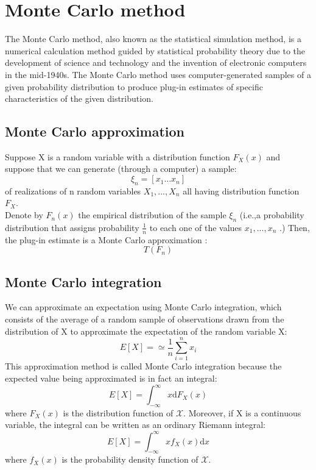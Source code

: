 \section{Monte Carlo method}
 The Monte Carlo method, also known as the statistical simulation method, is a numerical calculation method guided by statistical probability theory due to the development of science and technology and the invention of electronic computers in the mid-1940s. The Monte Carlo method uses computer-generated samples of a given probability distribution to produce plug-in estimates of specific characteristics of the given distribution. \cite{anderson1986scientific,binder1993monte} \\
\subsection{Monte Carlo approximation}
Suppose X is a random variable with a distribution function $F_{X}(x)$ and suppose that we can generate (through a computer) a sample: \cite{MonteCarlo}
\begin{equation} \nonumber 
\xi _{n} = \left [ x_{1} \dots x_{n}  \right ]  
\end{equation}
of realizations of  n random variables  $X_{1}, ..., X_{n}$ all having distribution function  $F_{X}$. \\

Denote by $F_{n}(x)$ the empirical distribution of the sample $\xi _{n} $ (i.e.,a probability distribution that assigns probability $\frac{1}{n}$ to each one of the values $x_{1}, ..., x_{n}$ .)
Then, the plug-in estimate is a Monte Carlo approximation : 
\begin{equation} \nonumber 
T(F_{n} )  
\end{equation}

\subsection{Monte Carlo integration}
We can approximate an expectation using Monte Carlo integration, which consists of the average of a random sample of observations drawn from the distribution of X to approximate the expectation of the random variable X:  \cite{MonteCarlo}
\begin{equation} \nonumber 
E\left [  X \right ] =\simeq \frac{1}{n}\sum_{i=1}^{n}x_{i}   
\end{equation}
This approximation method is called Monte Carlo integration because the expected value being approximated is in fact an integral:
\begin{equation} \nonumber 
E\left [  X \right ] = \int_{-\infty }^{\infty}x\mathrm{d}F_{X}(x)   
\end{equation}
where $F_{X}(x)$ is the distribution function of $\mathcal{X}$.
Moreover, if  X is a continuous variable, the integral can be written as an ordinary Riemann integral:
\begin{equation} \nonumber 
E\left [ X \right ] = \int_{-\infty }^{\infty } x f_{X}(x)\mathrm{d}x  
\end{equation}
where $f_{X}(x)$ is the probability density function of $\mathcal{X}$.